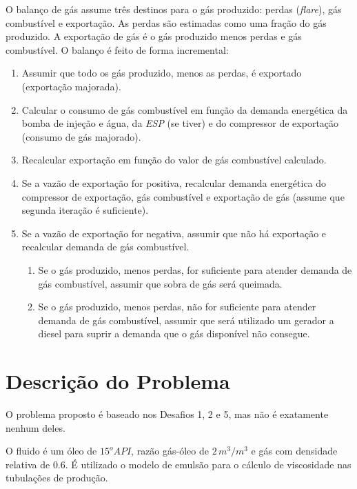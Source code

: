 \documentclass[final,5p]{elsarticle}
\numberwithin{equation}{section}
\begin{document}
        O balanço de gás assume três destinos para o gás produzido: perdas (\emph{flare}), gás combustível e exportação. As perdas são estimadas como uma fração do gás produzido. A exportação de gás é o gás produzido menos perdas e gás combustível. O balanço é feito de forma incremental:

        \begin{enumerate}
            \item Assumir que todo os gás produzido, menos as perdas, é exportado (exportação majorada).
            \item Calcular o consumo de gás combustível em função da demanda energética da bomba de injeção e água, da \emph{ESP} (se tiver) e do compressor de exportação (consumo de gás majorado).
            \item Recalcular exportação em função do valor de gás combustível calculado.
            \item Se a vazão de exportação for positiva, recalcular demanda energética do compressor de exportação, gás combustível e exportação de gás (assume que segunda iteração é suficiente).
            \item Se a vazão de exportação for negativa, assumir que não há exportação e recalcular demanda de gás combustível.
            \begin{enumerate}
                \item Se o gás produzido, menos perdas, for suficiente para atender demanda de gás combustível, assumir que sobra de gás será queimada.
                \item Se o gás produzido, menos perdas, não for suficiente para atender demanda de gás combustível, assumir que será utilizado um gerador a diesel para suprir a demanda que o gás disponível não consegue.
            \end{enumerate}
        \end{enumerate}

    \section{Descrição do Problema}

        O problema proposto é baseado nos Desafios 1, 2 e 5, mas não é exatamente nenhum deles.

        O fluido é um óleo de $15^o API$, razão gás-óleo de $2\,m^3/m^3$ e gás com densidade relativa de $0.6$. É utilizado o modelo de emulsão para o cálculo de viscosidade nas tubulações de produção.
\end{document}
